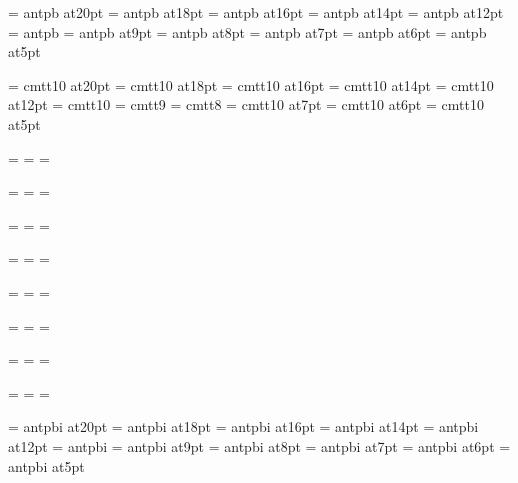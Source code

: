 \font\twentybf=     antpb at20pt
\font\eighteenbf=   antpb at18pt
\font\sixteenbf=    antpb at16pt
\font\fourteenbf=   antpb at14pt
\font\twelvebf=     antpb at12pt
\font\tenbf=        antpb
\font\ninebf=       antpb at9pt
\font\eightbf=      antpb at8pt
\font\sevenbf=      antpb at7pt
\font\sixbf=        antpb at6pt
\font\fivebf=       antpb at5pt

\font\twentytt=     cmtt10 at20pt
\font\eighteentt=   cmtt10 at18pt
\font\sixteentt=    cmtt10 at16pt
\font\fourteentt=   cmtt10 at14pt
\font\twelvett=     cmtt10 at12pt
\font\tentt=        cmtt10
\font\ninett=       cmtt9
\font\eighttt=      cmtt8
\font\seventt=      cmtt10 at7pt
\font\sixtt=        cmtt10 at6pt
\font\fivett=       cmtt10 at5pt




=\tenrm
{}=\sevenrm
{}=\fiverm
\def\rm{\fam=0 \tenrm}

=\teni
{}=\seveni
{}=\fivei
\def\mit{\fam=1}

=\tensy
{}=\sevensy
{}=\fivesy
\def\cal{\fam=2}

=\tenex
{}=\sevenex
{}=\fiveex


\def\it{\fam=\itfam \tenit}
\textfont\itfam=\tenit
\scriptfont\itfam=\sevenit
\scriptscriptfont\itfam=\fiveit

\def\sl{\fam=\slfam \tensl}
\textfont\slfam=\tensl
\scriptfont\slfam=\sevensl
\scriptscriptfont\slfam=\fivesl

\def\bf{\fam=\bffam \tenbf}
\textfont\bffam=\tenbf
\scriptfont\bffam=\sevenbf
\scriptscriptfont\bffam=\fivebf

\def\tt{\fam=\ttfam \tentt}
\textfont\ttfam=\tentt
\scriptfont\ttfam=\seventt
\scriptscriptfont\ttfam=\fivett

\font\twentyitbf=      antpbi at20pt
\font\eighteenitbf=    antpbi at18pt
\font\sixteenitbf=     antpbi at16pt
\font\fourteenitbf=    antpbi at14pt
\font\twelveitbf=      antpbi at12pt
\font\itbf=            antpbi
\font\nineitbf=        antpbi at9pt
\font\eightitbf=       antpbi at8pt
\font\sevenitbf=       antpbi at7pt
\font\sixitbf=         antpbi at6pt
\font\fiveitbf=        antpbi at5pt

